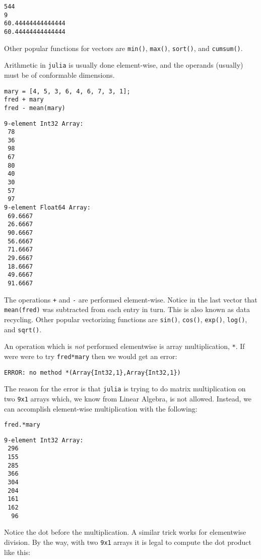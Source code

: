 \documentclass[11pt]{article}
\begin{document}
\begin{verbatim}
544
9
60.44444444444444
60.44444444444444
\end{verbatim}

Other popular functions for vectors are \texttt{min()}, \texttt{max()}, \texttt{sort()},
and \texttt{cumsum()}.

Arithmetic in \texttt{julia} is usually done element-wise, and the operands
(usually) must be of conformable dimensions.

\begin{verbatim}
mary = [4, 5, 3, 6, 4, 6, 7, 3, 1];
fred + mary
fred - mean(mary)
\end{verbatim}

\begin{verbatim}
9-element Int32 Array:
 78
 36
 98
 67
 80
 40
 30
 57
 97
9-element Float64 Array:
 69.6667
 26.6667
 90.6667
 56.6667
 71.6667
 29.6667
 18.6667
 49.6667
 91.6667
\end{verbatim}

The operations \texttt{+} and \texttt{-} are performed element-wise. Notice in the
last vector that \texttt{mean(fred)} was subtracted from each entry in
turn. This is also known as data recycling. Other popular vectorizing
functions are \texttt{sin()}, \texttt{cos()}, \texttt{exp()}, \texttt{log()}, and \texttt{sqrt()}.

An operation which is \emph{not} performed elementwise is array multiplication, \texttt{*}.  If were were to try \texttt{fred*mary} then we would get an error:

\begin{verbatim}
ERROR: no method *(Array{Int32,1},Array{Int32,1})
\end{verbatim}

The reason for the error is that \texttt{julia} is trying to do matrix multiplication on two \texttt{9x1} arrays which, we know from Linear Algebra, is not allowed. Instead, we can accomplish element-wise multiplication with the following:

\begin{verbatim}
fred.*mary
\end{verbatim}

\begin{verbatim}
9-element Int32 Array:
 296
 155
 285
 366
 304
 204
 161
 162
  96
\end{verbatim}

Notice the dot before the multiplication.  A similar trick works for
elementwise division.  By the way, with two \texttt{9x1} arrays it is legal
to compute the dot product like this:
\end{document}
